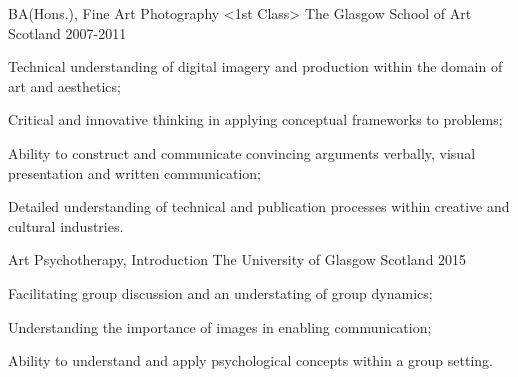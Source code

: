 \begin{cventries}
    
\cventry
    {BA(Hons.), Fine Art Photography <1st Class> } %
    {\newline The Glasgow School of Art } %
    {Scotland} %
    {2007-2011} %
    {
      \begin{cvitems} %
      \item{Technical understanding of digital imagery and production within the domain of art and aesthetics;}
      \item{Critical and innovative thinking in applying conceptual frameworks to problems;}
      \item{Ability to construct and communicate convincing arguments verbally, visual presentation and written communication;}
      \item{Detailed understanding of technical and publication processes within creative and cultural industries.}
      \end{cvitems}
    }
\cventry
    {Art Psychotherapy, Introduction} %
    {\newline The University of Glasgow} %
    {Scotland} %
    {2015} %
    {
      \begin{cvitems} %
        \item{Facilitating group discussion and an understating of group dynamics;}
        \item{Understanding the importance of images in enabling communication;}
        \item{Ability to understand and apply psychological concepts within a group setting.}
      \end{cvitems}
    }
\end{cventries}
\vspace{5mm}
